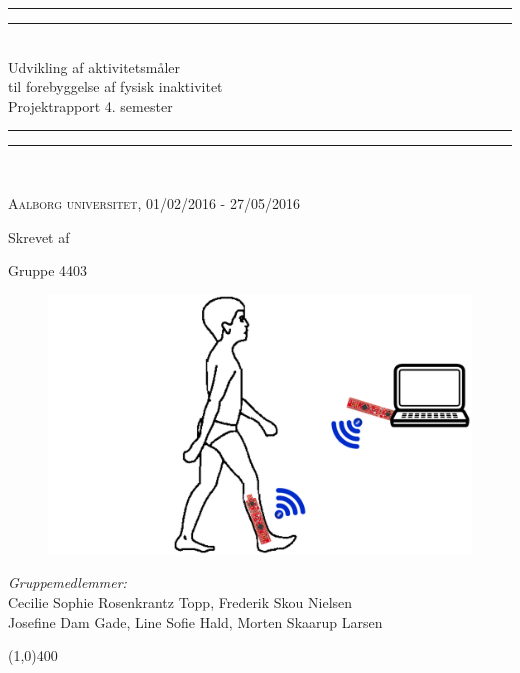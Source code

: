 \begin{center}
	\vspace*{\baselineskip}
	\rule{\textwidth}{1.6pt}\vspace*{-\baselineskip}\vspace*{2pt} %
	\rule{\textwidth}{0.4pt}\\[\baselineskip] %
	
	{\huge Udvikling af aktivitetsmåler\\\hspace*{2ex} til forebyggelse af fysisk inaktivitet \\[0.5\baselineskip] \large Projektrapport 4. semester}\\[0.2\baselineskip] %
	
	\rule{\textwidth}{0.4pt}\vspace*{-\baselineskip}\vspace{3.2pt} %
	\rule{\textwidth}{1.6pt}\\[\baselineskip] %
	\vspace*{3\baselineskip}
	
	\scshape %
	Aalborg universitet,  01/02/2016 - 27/05/2016 \par %
	
	\vspace*{2\baselineskip} %
	
	Skrevet af \\
	{\Large Gruppe 4403\par}
\end{center} %
\begin{figure}[H]
	\centering
	\begin{minipage}[c]{1\textwidth}
		\includegraphics[width=.75\textwidth]{figures/forside2.PNG}
	\end{minipage}
	\hfill
\end{figure}

\vspace*{\fill}
\begin{center}
	\textit{Gruppemedlemmer:}\\
	Cecilie Sophie Rosenkrantz Topp, Frederik Skou Nielsen \\
	Josefine Dam Gade, Line Sofie Hald, Morten Skaarup Larsen
\end{center}
\begin{center}
	\line(1,0){400}
\end{center}